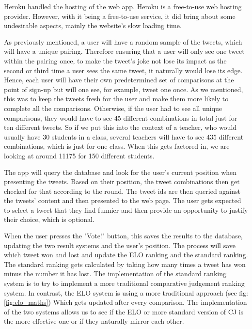 	Heroku handled the hosting of the web app. Heroku is a free-to-use web hosting provider. However, with it being a free-to-use service, it did bring about some undesirable aspects, mainly the website's slow loading time.
	
	As previously mentioned, a user will have a random sample of the tweets, which will have a unique pairing. Therefore ensuring that a user will only see one tweet within the pairing once, to make the tweet's joke not lose its impact as the second or third time a user sees the same tweet, it naturally would lose its edge. Hence, each user will have their own predetermined set of comparisons at the point of sign-up but will one see, for example, tweet one once. As we mentioned, this was to keep the tweets fresh for the user and make them more likely to complete all the comparisons. Otherwise, if the user had to see all unique comparisons, they would have to see 45 different combinations in total just for ten different tweets. So if we put this into the context of a teacher, who would usually have 30 students in a class, several teachers will have to see 435 different combinations, which is just for one class. When this gets factored in, we are looking at around 11175 for 150 different students.
	
	The app will query the database and look for the user's current position when presenting the tweets. Based on their position, the tweet combinations then get checked for that according to the round. The tweet ids are then queried against the tweets' content and then presented to the web page. The user gets expected to select a tweet that they find funnier and then provide an opportunity to justify their choice, which is optional.   
	
	When the user presses the "Vote!" button, this saves the results to the database, updating the two result systems and the user's position. The process will save which tweet won and lost and update the ELO ranking and the standard ranking. The standard ranking gets calculated by taking how many times a tweet has won minus the number it has lost. The implementation of the standard ranking system is to try to implement a more traditional comparative judgement ranking system. In contrast, the ELO system is using a more traditional approach (see fig: \ref{fig:elo_maths}) Which gets updated after every comparison. The implementation of the two systems allows us to see if the ELO or more standard version of CJ is the more effective one or if they naturally mirror each other.
	
